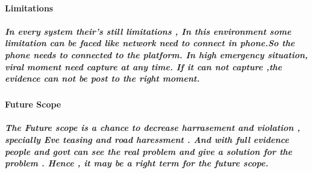 \documentclass{article}
\begin{document}
\paragraph{Limitations}
\subparagraph{In every system their's still limitations , In this environment some limitation can be faced like network need to connect in phone.So the phone needs to connected to the platform. In high emergency situation, viral moment need capture at any time. If it can not capture ,the evidence can not be post to the 
right moment.}



\paragraph{Future Scope}
\subparagraph{The Future scope is a chance to decrease harrasement and violation , specially Eve teasing and road haressment . And with full evidence people and govt can see the real problem and give a solution for the problem . Hence , it may be a right term for the future scope. }
\end{document}
